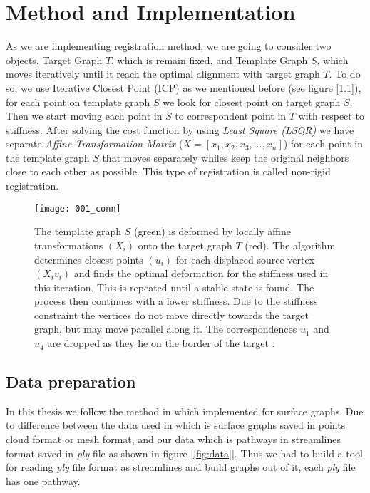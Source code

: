 \documentclass[../structure.tex]{subfiles}
\begin{document}
\chapter{Method and Implementation}
As we are implementing registration method, we are going to consider two objects, Target Graph $T$, which is remain fixed, and Template Graph $S$, which moves iteratively until it reach the optimal alignment with target graph $T$. To do so, we use Iterative Closest Point (ICP) as we mentioned before (see figure [\ref{fig:icp}]), for each point on template graph $S$ we look for closest point on target graph $S$. Then we start moving each point in $S$ to correspondent point in $T$ with respect to stiffness. After solving the cost function by using \textit{Least Square (LSQR)} we have separate \textit{Affine Transformation Matrix} ($X = [x_{1}, x_{2}, x_{3}, ...,x_{n}]$) for each point in the template graph $S$ that moves separately whiles keep the original neighbors close to each other as possible. This type of registration is called non-rigid registration.

\begin{figure}[h!]
\centering
\texttt{[image: 001\_conn]}
\captionsetup{justification=centering}
\caption{The template graph $S$ (green) is deformed by locally affine transformations $(X_{i})$ onto the target graph $T$ (red). The algorithm determines closest points $(u_{i})$ for each displaced source vertex $(X_{i}v_{i})$ and finds the optimal deformation for the stiffness used in this iteration. This is repeated until a stable state is found. The process then continues with a lower stiffness. Due to the stiffness constraint the vertices do not move directly towards the target graph, but may move parallel along it. The correspondences $u_{1}$
and $u_{4}$ are dropped as they lie on the border of the target \cite{Amberg2007}.}
\label{fig:icp}
\end{figure}

\section{Data preparation}
In this thesis we follow the method in \cite{Amberg2007} which implemented for surface graphs. Due to difference between the data used in \cite{Amberg2007} which is surface graphs saved in points cloud format or mesh format, and our data which is pathways in streamlines format saved in \textit{ply} file as shown in figure [\ref{fig:data}]. Thus we had to build a tool for reading \textit{ply} file format as streamlines and build graphs out of it, each \textit{ply} file has one pathway.
\end{document}
